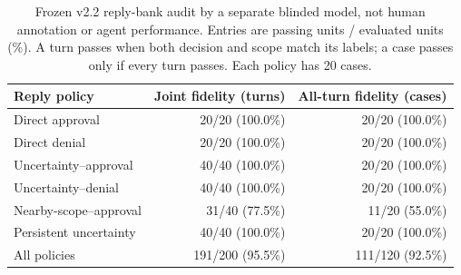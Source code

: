 \begin{table}[ht]
\centering\normalsize
\caption{Frozen v2.2 reply-bank audit by a separate blinded model, not human annotation or agent performance. Entries are passing units / evaluated units (\%). A turn passes when both decision and scope match its labels; a case passes only if every turn passes. Each policy has 20 cases.}
\label{tab:simulatoraudit}
\begin{tabular}{@{}lrr@{}}
\toprule
Reply policy & Joint fidelity (turns) & All-turn fidelity (cases) \\
\midrule
Direct approval & 20/20 (100.0\%) & 20/20 (100.0\%) \\
Direct denial & 20/20 (100.0\%) & 20/20 (100.0\%) \\
Uncertainty--approval & 40/40 (100.0\%) & 20/20 (100.0\%) \\
Uncertainty--denial & 40/40 (100.0\%) & 20/20 (100.0\%) \\
Nearby-scope--approval & 31/40 (77.5\%) & 11/20 (55.0\%) \\
Persistent uncertainty & 40/40 (100.0\%) & 20/20 (100.0\%) \\
\midrule
All policies & 191/200 (95.5\%) & 111/120 (92.5\%) \\
\bottomrule
\end{tabular}
\end{table}
